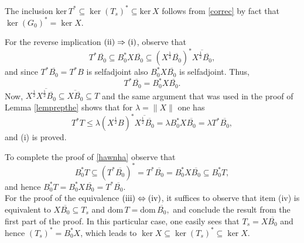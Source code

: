 \documentclass{amsart}
\makeatletter
\newcommand{\n}{\|}
\newcommand{\ifaf}{\Leftrightarrow}
\newcommand{\kerr}{\mathrm{ker}\,}
\newcommand{\D}{\mathrm{dom}\,}
\newcommand{\DT}{\mathrm{dom}\,T }
\newcommand{\adj}{^*}
\newcommand{\ts}{T_s}
\newcommand{\tstar}{T^{*}}
\newcommand{\half}{^{\frac{1}{2}}}
\newcommand{\inclu}{\subseteq}
\numberwithin{equation}{section}
\renewenvironment{proof}[1][\proofname]{%
   \par\pushQED{\qed}\normalfont%
   \topsep6\p@\@plus6\p@\relax
   \trivlist\item[\hskip\labelsep\bfseries#1\@addpunct{.}]%
   \ignorespaces
}{%
   \popQED\endtrivlist\@endpefalse
}
\makeatother
\begin{document}
\begin{proof}
                 \hspace*{0.4cm}  The inclusion $\kerr T\adj \inclu \ker (\ts)\adj  \inclu \kerr X$ follows  from \eqref{correc}  by fact that  $\ker (G_0)\adj= \ker X$.


               For the reverse implication $\rm(ii) \Rightarrow (i)$, observe that
   $$
   \tstar \overline{B_0} \inclu B_0\adj X \overline{B_0} \inclu (X\half \overline{B_0})\adj \overline{X\half \overline{B_0}},
   $$
    and since  $ \tstar \overline{B_0} =\tstar B $ is selfadjoint also   $B_0\adj X \overline{B_0}$    is   selfadjoint. Thus,
   \begin{equation}\label{9rib}
      \tstar \overline{B_0}= B_0\adj X \overline{B_0}.
  \end{equation}
  Now, $X\half \overline{X\half \overline{B_0} } \inclu \overline{X\overline{B_0}} \inclu T$ and the same argument that was used in the proof of  Lemma \ref{lemprepthe} shows that for  $\lambda = \n X \n $  one has
  $$
  \tstar T \leq \lambda  (X\half B)\adj \overline{X\half \overline{B_0}} = \lambda  B_0\adj X\overline{B_0}  = \lambda \tstar \overline{B_0},
  $$
  and (i) is proved.


To complete the proof of  \eqref{hawnha}  observe that
 $$
    B_0\adj T \inclu (\tstar \overline{B_0})\adj= \tstar \overline{B_0} = B_0\adj X \overline{B_0} \inclu B_0\adj T,
 $$
  and hence $B_0\adj T= B_0\adj X \overline{B_0} =\tstar \overline{B_0}.$\\
   \hspace*{0.4cm}  For the proof of the equivalence $\rm(iii) \ifaf (iv)$, it suffices to observe that item (iv) is   equivalent to  $
  X \overline{B_0} \inclu \ts  $ and $ \DT = \D \overline{B_0},$ and conclude the result from the first part of the proof. In this particular case, one easily sees that $\ts =X \overline{B_0} $ and hence $(\ts)\adj = B_0\adj X$, which leads to  $\ker X \inclu \ker  (\ts)\adj \inclu \ker X.$
\end{proof}
\end{document}
